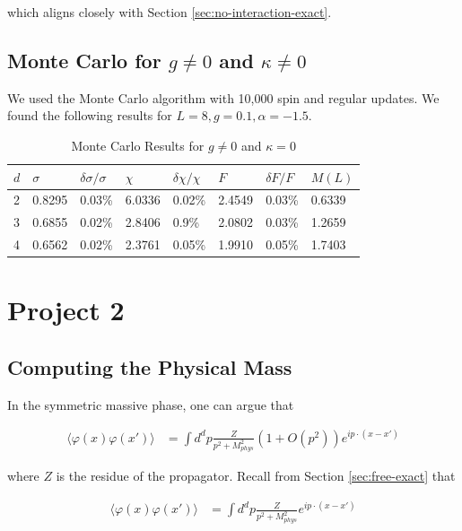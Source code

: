 \documentclass[12]{report}
\newcommand\0{\mathbf{0}}
\newcommand\<{\langle}
\renewcommand\>{\rangle}
\renewcommand\phi{\varphi}
\begin{document}
which aligns closely with Section \ref{sec:no-interaction-exact}.

\section{Monte Carlo for $g\neq0$ and $\kappa \neq 0$}


We used the Monte Carlo algorithm with 10,000 spin and regular updates. We found the following results for $L = 8, g = 0.1, \alpha = -1.5$.

\begin{table}[H]
\centering
\begin{tabular}{|l|l|l|l|l|l|l|l|}
\hline
$d$ & $\sigma$ & $\delta \sigma / \sigma$ & $\chi$ & $\delta \chi / \chi$ & $F$ & $ \delta F / F$ & $M(L)$ \\ \hline
2   & 0.8295 & 0.03\% & 6.0336 & 0.02\%& 2.4549 & 0.03\% & 0.6339 \\
3   & 0.6855 & 0.02\%& 2.8406 & 0.9\% & 2.0802 & 0.03\% & 1.2659  \\
4   & 0.6562 &  0.02\% & 2.3761 & 0.05\% & 1.9910 &  0.05\% & 1.7403 \\ \hline
\end{tabular}
\caption{Monte Carlo Results for $g\neq 0$ and $\kappa = 0$}
\end{table}


\chapter{Project 2}

\section{Computing the Physical Mass}

In the symmetric massive phase, one can argue that 


\begin{align*}
\< \phi(x) \phi(x') \> &= \int d^dp \frac{Z}{p^2 + M^2_{phys}} (1 + O(p^2)) e^{ip \cdot (x-x')}	
\end{align*}

where $Z$ is the residue of the propagator. Recall from Section \ref{sec:free-exact} that

\begin{align*}
\< \phi(x) \phi(x') \> &= \int d^dp \frac{Z}{p^2 + M^2_{phys}} e^{ip \cdot (x-x')}	
\end{align*}
\end{document}
